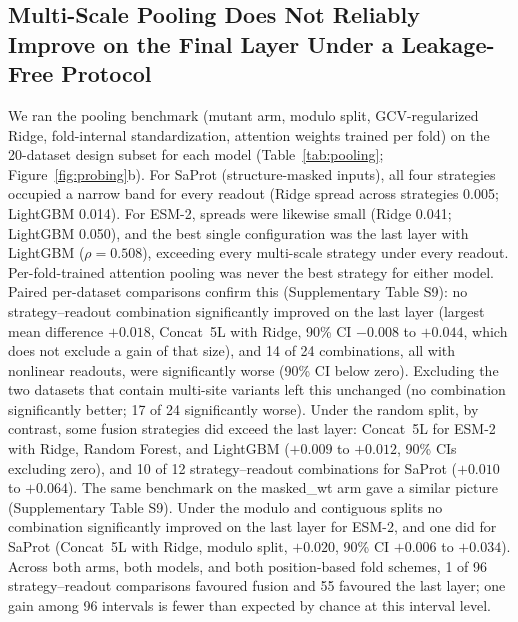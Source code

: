\documentclass[numbered,webpdf,modern,large]{oup-authoring-template}
\newcommand{\rone}[1]{#1}
\newcommand{\rtwo}[1]{#1}
\newcommand{\rthree}[1]{#1}
\begin{document}
\subsection{\rone{Multi-Scale Pooling \rthree{Does Not Reliably Improve on the Final Layer} Under a Leakage-Free Protocol}}

\rone{We ran the pooling benchmark (mutant arm, modulo
split, GCV-regularized Ridge, fold-internal standardization, attention weights trained
per fold) on the 20-dataset design subset for each model
(Table~\ref{tab:pooling}; Figure~\ref{fig:probing}b).
For SaProt (structure-masked inputs), all four strategies occupied a narrow band for
every readout (Ridge spread across strategies 0.005; LightGBM 0.014). For ESM-2,
spreads were likewise small (Ridge 0.041; LightGBM 0.050), and the best single
configuration was the last layer with LightGBM ($\rho = 0.508$), exceeding every
multi-scale strategy under every readout. Per-fold-trained attention pooling was
never the best strategy for either model. \rtwo{Paired per-dataset comparisons confirm
this (Supplementary Table \rthree{S9}): no strategy--readout combination
\rthree{significantly improved on} the last layer (largest mean difference $+0.018$, Concat~5L with Ridge, 90\%
CI $-0.008$ to $+0.044$\rthree{, which does not exclude a gain of that size}), and 14 of 24 combinations, all with nonlinear readouts, were
significantly worse (90\% CI below zero).} \rthree{Excluding the two datasets that
contain multi-site variants left this unchanged (no combination significantly better;
17 of 24 significantly worse). Under the random split, by contrast, some fusion
strategies did exceed the last layer: Concat~5L for ESM-2 with Ridge, Random Forest,
and LightGBM ($+0.009$ to $+0.012$, 90\% CIs excluding zero), and 10 of 12
strategy--readout combinations for SaProt ($+0.010$ to $+0.064$).} \rthree{The same
benchmark on the masked\_wt arm gave a similar picture (Supplementary Table S9). Under
the modulo and contiguous splits no combination significantly improved on the last
layer for ESM-2, and one did for SaProt (Concat~5L with Ridge, modulo split, $+0.020$,
90\% CI $+0.006$ to $+0.034$). Across both arms, both models, and both position-based
fold schemes, 1 of 96 strategy--readout comparisons favoured fusion and 55 favoured
the last layer; one gain among 96 intervals is fewer than expected by chance at this
interval level.}}
\end{document}

